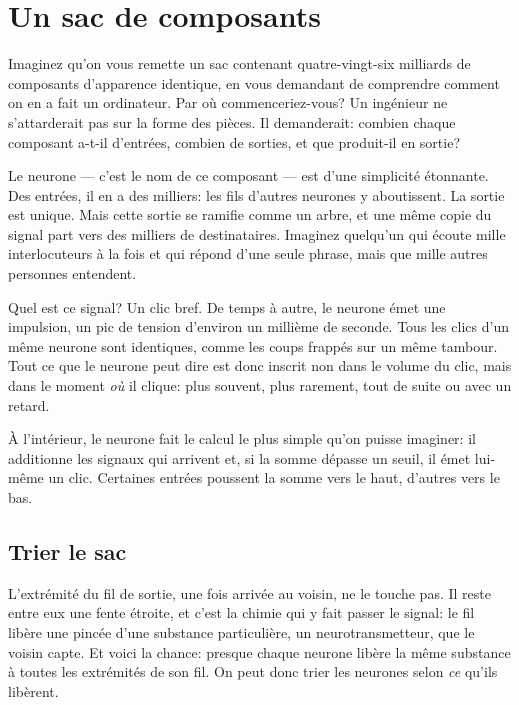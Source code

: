 \chapter{Un sac de composants}


Imaginez qu'on vous remette un sac contenant quatre-vingt-six milliards de composants d'apparence identique, en vous demandant de comprendre comment on en a fait un ordinateur. Par où commenceriez-vous? Un ingénieur ne s'attarderait pas sur la forme des pièces. Il demanderait: combien chaque composant a-t-il d'entrées, combien de sorties, et que produit-il en sortie?

Le neurone --- c'est le nom de ce composant --- est d'une simplicité étonnante. Des entrées, il en a des milliers: les fils d'autres neurones y aboutissent. La sortie est unique. Mais cette sortie se ramifie comme un arbre, et une même copie du signal part vers des milliers de destinataires. Imaginez quelqu'un qui écoute mille interlocuteurs à la fois et qui répond d'une seule phrase, mais que mille autres personnes entendent.

Quel est ce signal? Un clic bref. De temps à autre, le neurone émet une impulsion, un pic de tension d'environ un millième de seconde. Tous les clics d'un même neurone sont identiques, comme les coups frappés sur un même tambour. Tout ce que le neurone peut dire est donc inscrit non dans le volume du clic, mais dans le moment \emph{où} il clique: plus souvent, plus rarement, tout de suite ou avec un retard.

À l'intérieur, le neurone fait le calcul le plus simple qu'on puisse imaginer: il additionne les signaux qui arrivent et, si la somme dépasse un seuil, il émet lui-même un clic. Certaines entrées poussent la somme vers le haut, d'autres vers le bas.

\section*{Trier le sac}

L'extrémité du fil de sortie, une fois arrivée au voisin, ne le touche pas. Il reste entre eux une fente étroite, et c'est la chimie qui y fait passer le signal: le fil libère une pincée d'une substance particulière, un neurotransmetteur, que le voisin capte. Et voici la chance: presque chaque neurone libère la même substance à toutes les extrémités de son fil. On peut donc trier les neurones selon \emph{ce} qu'ils libèrent.

